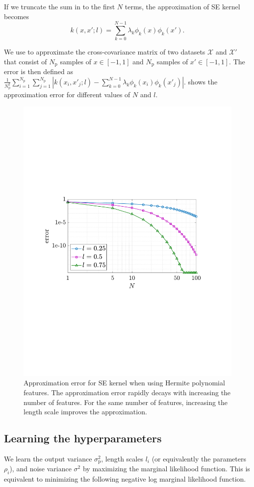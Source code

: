 \documentclass{article}
\begin{document}
If we truncate the sum in  to the first $N$ terms, the approximation of SE kernel becomes
\begin{equation}\label{eqn622}
	k(x, x'; l) = \sum_{k=0}^{N-1} \lambda_k \phi_k(x) \phi_k(x').
\end{equation}

We use  to approximate the cross-covariance matrix of two datasets $\mathcal{X}$ and $\mathcal{X}'$ that consist of $N_\text{p}$ samples of $x \in [-1,1]$ and $N_\text{p}$ samples of $x' \in [-1,1]$.
The error is then defined as $\frac{1}{N_\text{p}^2} \sum_{i=1}^{N_\text{p}} \sum_{j=1}^{N_\text{p}}| k(x_i,x'_j;l) -  \sum_{k=0}^{N-1} \lambda_k \phi_k(x_i) \phi_k(x'_j)|$.
 shows the approximation error for different values of $N$ and $l$.

\begin{figure}[t]
	\centering
	\includegraphics[width=0.6\linewidth]{img/approxError.pdf}
	\caption{Approximation error for SE kernel when using Hermite polynomial features. The approximation error rapidly decays with increasing the number of features. For the same number of features, increasing the length scale improves the approximation.}
	\label{fig:approxError}
\end{figure}

\subsection{Learning the hyperparameters}
\label{sec:hyperparameters}
We learn the output variance $\sigma^2_\text{p}$, length scales $l_i$ (or equivalently the parameters $\rho_i$), and noise variance $\sigma^2$ by maximizing the marginal likelihood function.
This is equivalent to minimizing the following negative log marginal likelihood function.
\end{document}
